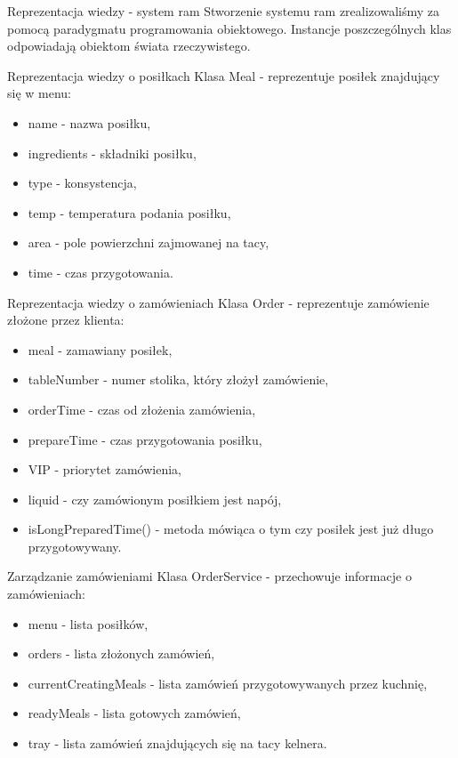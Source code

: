 \documentclass[a4paper,10pt]{beamer}
\begin{document}
		\begin{frame}{Reprezentacja wiedzy - system ram}
			Stworzenie systemu ram zrealizowaliśmy za pomocą paradygmatu programowania obiektowego. Instancje poszczególnych klas odpowiadają obiektom świata rzeczywistego.
		\end{frame}
		\begin{frame}{Reprezentacja wiedzy o posiłkach}
			Klasa Meal - reprezentuje posiłek znajdujący się w menu:
			\begin{itemize}
				\item name - nazwa posiłku,
				\item ingredients - składniki posiłku,
				\item type - konsystencja,
				\item temp - temperatura podania posiłku,
				\item area - pole powierzchni zajmowanej na tacy,
				\item time - czas przygotowania. 
			\end{itemize}
		\end{frame}
		\begin{frame}{Reprezentacja wiedzy o zamówieniach}
			Klasa Order - reprezentuje zamówienie złożone przez klienta:
			\begin{itemize}
				\item meal - zamawiany posiłek,
				\item tableNumber - numer stolika, który złożył zamówienie,
				\item orderTime - czas od złożenia zamówienia,
				\item prepareTime - czas przygotowania posiłku,
				\item VIP - priorytet zamówienia,
				\item liquid - czy zamówionym posiłkiem jest napój,
				\item isLongPreparedTime() - metoda mówiąca o tym czy posiłek jest już długo przygotowywany.
			\end{itemize}
		\end{frame}
		\begin{frame}{Zarządzanie zamówieniami}
			Klasa OrderService - przechowuje informacje o zamówieniach:
			\begin{itemize}
				\item menu - lista posiłków,
				\item orders - lista złożonych zamówień,
				\item currentCreatingMeals - lista zamówień przygotowywanych przez kuchnię,
				\item readyMeals - lista gotowych zamówień,
				\item tray - lista zamówień znajdujących się na tacy kelnera.
			\end{itemize}
		\end{frame}
		
\end{document}
